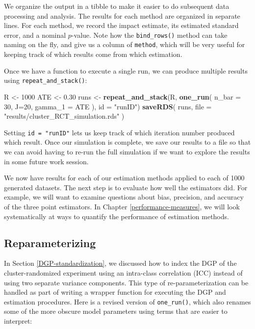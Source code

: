 \documentclass[
]{book}
\newenvironment{Shaded}{\begin{snugshade}}{\end{snugshade}}
\newcommand{\AttributeTok}[1]{\textcolor[rgb]{0.13,0.29,0.53}{#1}}
\newcommand{\DecValTok}[1]{\textcolor[rgb]{0.00,0.00,0.81}{#1}}
\newcommand{\FloatTok}[1]{\textcolor[rgb]{0.00,0.00,0.81}{#1}}
\newcommand{\FunctionTok}[1]{\textcolor[rgb]{0.13,0.29,0.53}{\textbf{#1}}}
\newcommand{\NormalTok}[1]{#1}
\newcommand{\OtherTok}[1]{\textcolor[rgb]{0.56,0.35,0.01}{#1}}
\newcommand{\StringTok}[1]{\textcolor[rgb]{0.31,0.60,0.02}{#1}}
\begin{document}
We organize the output in a tibble to make it easier to do subsequent data processing and analysis.
The results for each method are organized in separate lines.
For each method, we record the impact estimate, its estimated standard error, and a nominal \(p\)-value.
Note how the \texttt{bind\_rows()} method can take naming on the fly, and give us a column of \texttt{method}, which will be very useful for keeping track of which results come from which estimation.

Once we have a function to execute a single run, we can produce multiple results using \texttt{repeat\_and\_stack()}:

\begin{Shaded}
\begin{Highlighting}[]
\NormalTok{R }\OtherTok{\textless{}{-}} \DecValTok{1000}
\NormalTok{ATE }\OtherTok{\textless{}{-}} \FloatTok{0.30}
\NormalTok{runs }\OtherTok{\textless{}{-}} \FunctionTok{repeat\_and\_stack}\NormalTok{(R, }
                         \FunctionTok{one\_run}\NormalTok{( }\AttributeTok{n\_bar =} \DecValTok{30}\NormalTok{, }\AttributeTok{J=}\DecValTok{20}\NormalTok{, }\AttributeTok{gamma\_1 =}\NormalTok{ ATE ),}
                         \AttributeTok{id =} \StringTok{"runID"}\NormalTok{) }
\FunctionTok{saveRDS}\NormalTok{( runs, }\AttributeTok{file =} \StringTok{"results/cluster\_RCT\_simulation.rds"}\NormalTok{ )}
\end{Highlighting}
\end{Shaded}

Setting \texttt{id\ =\ "runID"} lets us keep track of which iteration number produced which result.
Once our simulation is complete, we save our results to a file so that we can avoid having to re-run the full simulation if we want to explore the results in some future work session.

We now have results for each of our estimation methods applied to each of 1000 generated datasets.
The next step is to evaluate how well the estimators did.
For example, we will want to examine questions about bias, precision, and accuracy of the three point estimators.
In Chapter \ref{performance-measures}, we will look systematically at ways to quantify the performance of estimation methods.

\subsection{Reparameterizing}\label{one-run-reparameterization}

In Section \ref{DGP-standardization}, we discussed how to index the DGP of the cluster-randomized experiment using an intra-class correlation (ICC) instead of using two separate variance components.
This type of re-parameterization can be handled as part of writing a wrapper function for executing the DGP and estimation procedures.
Here is a revised version of \texttt{one\_run()}, which also renames some of the more obscure model parameters using terms that are easier to interpret:
\end{document}
